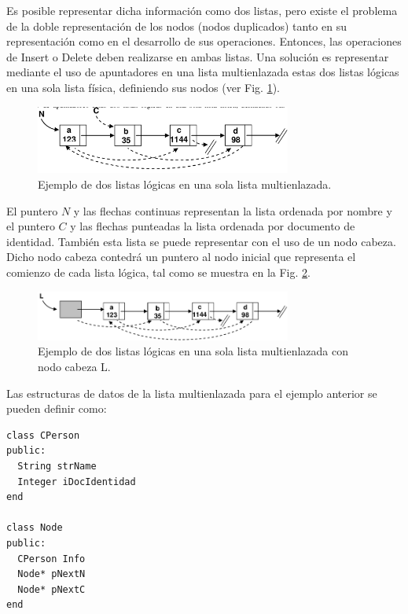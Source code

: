 Es posible representar dicha información como dos listas, pero existe el problema de la doble representación de los nodos (nodos duplicados) tanto en su representación como en el desarrollo de sus operaciones. Entonces, las operaciones de Insert o Delete deben realizarse en ambas listas. Una solución es representar mediante el uso de apuntadores en una lista multienlazada estas dos listas lógicas en una sola lista física, definiendo sus nodos (ver Fig. \ref{fig:multifirst}).
 
\begin{figure}[htp!]
  \begin{center}
    \includegraphics[width=0.75\textwidth]{images/first.png}
  \end{center}
  \caption{Ejemplo de dos listas lógicas en una sola lista multienlazada.}
  \label{fig:multifirst}
\end{figure}
 
 El puntero $N$ y las flechas continuas representan la lista ordenada por nombre y el puntero $C$ y las flechas punteadas la lista ordenada por documento de identidad. También esta lista se puede representar con el uso de un nodo cabeza. Dicho nodo cabeza contedrá un puntero al nodo inicial que representa el comienzo de cada lista lógica, tal como se muestra en la Fig. \ref{fig:multisecond}.

\begin{figure}[htp!]
  \begin{center}
    \includegraphics[width=0.75\textwidth]{images/second.png}
  \end{center}
  \caption{Ejemplo de dos listas lógicas en una sola lista multienlazada con nodo cabeza L.}
  \label{fig:multisecond}
\end{figure}


Las estructuras de datos de la lista multienlazada para el ejemplo anterior se pueden definir como:

\begin{lstlisting}[upquote=true, language=pseudo]
class CPerson
public:
  String strName
  Integer iDocIdentidad
end

class Node
public:
  CPerson Info
  Node* pNextN
  Node* pNextC
end
\end{lstlisting}

